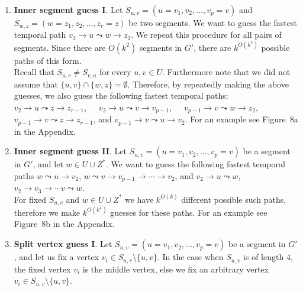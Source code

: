 \documentclass[a4paper,UKenglish,cleveref, autoref, thm-restate, anonymous]{lipics-v2021}
\newcounter{guesscounter}
\begin{document}
\begin{enumerate}[G-1.]
	\setcounter{enumi}{\value{guesscounter}}
	\item \label{FPT-guessFTPamongv2z2}
	\textbf{Inner segment guess I}.
	Let $S_{u,v} = (u=v_1,v_2, \dots, v_p = v)$ and $S_{w,z} = (w=z_1,z_2, \dots, z_r = z)$ be two segments. %
	We want to guess the fastest temporal path
	$v_2 \rightarrow u \leadsto w \rightarrow z_2$. 
	We repeat this procedure for all pairs of segments.
	Since there are $O(k^2)$ segments in $G'$,
	there are $k^{O(k^5)}$ possible paths of this form. \\
	Recall that $S_{u,v}\neq S_{v,u}$ for every $u,v\in U$. Furthermore note that we did not assume that $\{u,v\} \cap \{w,z\} = \emptyset$. Therefore, by repeatedly making the above guesses, we also guess the following fastest temporal paths: 
	${v_2 \rightarrow u \leadsto z \rightarrow z_{r-1}}$,\ \ \ 
	${v_2 \rightarrow u \leadsto v \rightarrow v_{p-1}}$,\ \ \  
	${v_{p-1} \rightarrow v \leadsto w \rightarrow z_{2}}$,\ \ \  
	${v_{p-1} \rightarrow v \leadsto z \rightarrow z_{r-1}}$, and  
	${v_{p-1} \rightarrow v \leadsto u \rightarrow v_{2}}$.
	For an example see Figure~8a in the Appendix.
	\item \label{FPT:guess-uToSegmentz2}
	\textbf{Inner segment guess II}.
	Let $S_{u,v} = (u=v_1,v_2, \dots, v_p = v)$ be a segment in $G'$,
	and let $w \in U \cup Z^*$. %
	We want to
	guess the following fastest temporal paths
	$w \leadsto u \rightarrow v_2$, $w \leadsto v \rightarrow v_{p-1} \rightarrow \cdots \rightarrow v_2$,
	and
	$v_2 \rightarrow u \leadsto w$, $v_2 \rightarrow v_3 \rightarrow \cdots v \leadsto w$.
	\\
	For fixed $S_{u,v}$ and $w \in U \cup Z^*$ we have $k^{O(k)}$ different possible such paths, therefore we make $k^{O(k^4)}$ guesses for these paths.
	For an example see Figure~8b in the Appendix.
	\item \label{FPT:guess-splitFromAnotherSegmentAndPaths}
	\textbf{Split vertex guess I}.
	Let $S_{u,v} = (u=v_1,v_2, \dots, v_p = v)$ be a segment in $G'$, and let us
	fix a vertex $v_i \in S_{u,v} \setminus \{u,v\}$.
	In the case when $S_{u,v}$ is of length $4$, the fixed vertex $v_i$ is the middle vertex, else we fix an arbitrary vertex $v_i \in S_{u,v} \setminus \{u,v\}$.

\end{enumerate}
\end{document}
